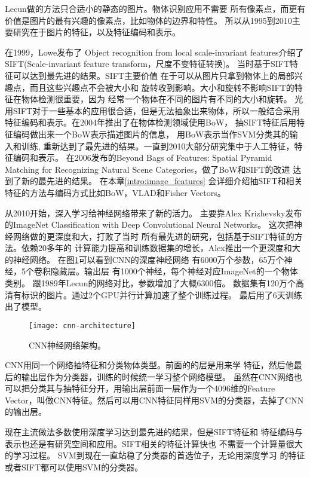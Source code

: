 Lecun做的方法只合适小的静态的图片。物体识别应用不需要
所有像素点，而更有价值是图片的最有兴趣的像素点，比如物体的边界和特性。
所以从1995到2010主要研究在于图片的特征，以及特征编码和表示。

在1999，Lowe发布了
Object recognition from local scale-invariant features介绍了
SIFT(Scale-invariant feature transform，尺度不变特征转换)。\cite{lowe1999object,lowe2004distinctive}
当时基于SIFT特征可以达到最先进的结果。SIFT主要价值
在于可以从图片只拿到物体上的局部兴趣点，而且这些兴趣点不会被大小和
旋转收到影响。大小和旋转不影响SIFT的特征在物体检测很重要，因为
经常一个物体在不同的图片有不同的大小和旋转。
光用SIFT对于一些基本的应用很合适，但是无法抽象出来物体，所以一般结合采用
特征编码和表示。在2004年推出了在物体检测领域使用BoW，
抽SIFT特征后用特征编码做出来一个BoW表示描述图片的信息，
用BoW表示当作SVM分类其的输入和训练,\cite{csurka2004visual}
重新达到了最先进的结果。一直到2010大部分研究集中于人工特征，特征编码和表示。
在2006发布的Beyond Bags of Features: Spatial Pyramid Matching
for Recognizing Natural Scene Categories，做了BoW和SIFT的改进
达到了新的最先进的结果。 \cite{lazebnik2006beyond}
在本章\ref{intro:image_features}
会详细介绍抽SIFT和相关特征的方法与编码方式比如BoW，VLAD和Fisher Vectors。

从2010开始，深入学习给神经网络带来了新的活力。
主要靠Alex Krizhevsky发布的ImageNet Classification with Deep Convolutional Neural Networks。
这次把神经网络做的更深度和大，打败了当时
所有最先进的研究，包括基于SIFT特征的方法。依赖20多年的
计算能力提高和训练数据集的增长，Alex推出一个更深度和大的神经网络。
在图\ref{fig:cnn-architecture}可以看到CNN的深度神经网络
有6000万个参数，65万个神经，5个卷积隐藏层。输出层
有1000个神经，每个神经对应ImageNet的一个物体类别。
跟1989年Lecun的网络对比，参数增加了大概6300倍。
数据集有120万个高清有标识的图片。通过2个GPU并行计算加速了整个训练过程。
最后用了6天训练出了模型。\cite{krizhevsky2012imagenet,lee2009convolutional}
\begin{figure}[H]
  \centering
    \texttt{[image: cnn-architecture]}
  \caption{CNN神经网络架构。\cite{krizhevsky2012imagenet}}
  \label{fig:cnn-architecture}
\end{figure}

CNN用同一个网络抽特征和分类物体类型。前面的的层是用来学
特征，然后他最后的输出层作为分类器，训练的时候统一学习整个网络模型。
虽然在CNN网络也可以把分类其与抽特征分开，用输出层前面一层作为一个4096维的Feature 
Vector，叫做CNN特征。然后可以用CNN特征同样用SVM的分类器，去掉了CNN的输出层。
\cite{razavian2014cnn}

现在主流做法多数使用深度学习达到最先进的结果，但是SIFT特征和
特征编码与表示也还是有研究空间和应用。SIFT相关的特征计算快也
不需要一个计算量很大的学习过程。
SVM到现在一直站稳了分类器的首选位子，无论用深度学习
的特征或者SIFT都可以使用SVM的分类器。

